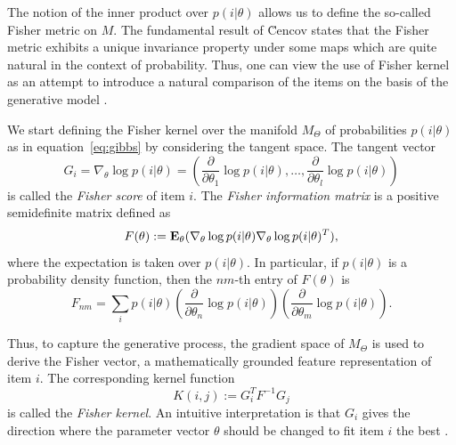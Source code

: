 The notion of the inner product over $p(i| \theta)$ allows us to define the so-called Fisher metric on $M$. The fundamental result of \u{C}encov \cite{cencov1982} states that the Fisher metric exhibits a unique invariance property under some maps which are quite natural in the context of probability. Thus, one can view the use of Fisher kernel as an attempt to introduce a natural comparison of the items on the basis of the generative model \cite{JH}. 

We start defining the Fisher kernel over the manifold $M_\Theta$ of probabilities $p(i| \theta)$ as in equation~\eqref{eq:gibbs} by considering the tangent space.
The tangent vector 
\begin{equation}
G_i=\nabla_\theta \log p(i|\theta)=\left(
\frac{\partial}{\partial \theta_1} \log p(i|\theta), \ldots,
\frac{\partial}{\partial \theta_l} \log p(i|\theta)\right)
\label{eq:Fisher-score}
\end{equation}
is called the {\em Fisher score} of item $i$. 
The {\em Fisher information matrix} is a positive semidefinite matrix defined as
%
\begin{equation}
F(\theta):= {\bf E_{\theta}}(\nabla _\theta\log p(i|\theta)\nabla _\theta \log p(i|\theta)^T),
\label{eq:fi}
\end{equation}
%
%
%
where the expectation is taken over $p(i|\theta)$. In particular, if $p(i|\theta)$ is a probability density function, then the $nm$-th entry of 
$F(\theta)$  is 
$$ F_{nm}=\sum_{i} p(i|\theta)
\left(\frac{\partial}{\partial \theta_n} \log p(i|\theta)\right)
\left(\frac{\partial}{\partial \theta_m} \log p(i|\theta)\right).$$

Thus, to capture the generative process, the gradient space of $M_\Theta$ is used to derive the Fisher vector, a mathematically grounded feature representation of item $i$. The corresponding kernel function 
%
\begin{equation}
K(i,j):= G^T_iF^{-1}G_j
\label{eq:Fisher-kernel}
\end{equation}
%
is called the {\em Fisher kernel}. An intuitive interpretation is that $G_i$ gives the direction where the parameter vector $\theta$ should be changed to fit item $i$ the best \cite{perronnin2007fisher}.


